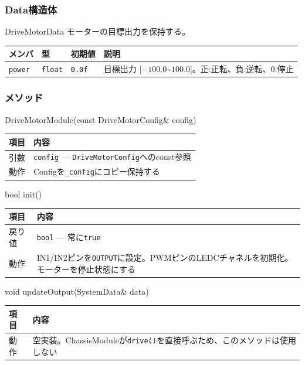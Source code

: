 \subsubsection{Data構造体}

\begin{funcblock}{DriveMotorData}
モーターの目標出力を保持する。

\begin{longtable}{l l l p{5.0cm}}
\toprule
\textbf{メンバ} & \textbf{型} & \textbf{初期値} & \textbf{説明} \\
\midrule
\endhead
\texttt{power} & \texttt{float} & \texttt{0.0f} & 目標出力 [$-100.0$\textasciitilde$100.0$]。正:正転、負:逆転、0:停止 \\
\bottomrule
\end{longtable}
\end{funcblock}

\subsubsection{メソッド}

\begin{funcblock}{DriveMotorModule(const DriveMotorConfig\& config)}
\begin{tabularx}{\textwidth}{l X}
\toprule
\textbf{項目} & \textbf{内容} \\
\midrule
引数   & \texttt{config} --- \texttt{DriveMotorConfig}へのconst参照 \\
動作   & Configを\texttt{\_config}にコピー保持する \\
\bottomrule
\end{tabularx}
\end{funcblock}

\begin{funcblock}{bool init()}
\begin{tabularx}{\textwidth}{l X}
\toprule
\textbf{項目} & \textbf{内容} \\
\midrule
戻り値   & \texttt{bool} --- 常に\texttt{true} \\
動作     & IN1/IN2ピンを\texttt{OUTPUT}に設定。PWMピンのLEDCチャネルを初期化。モーターを停止状態にする \\
\bottomrule
\end{tabularx}
\end{funcblock}

\begin{funcblock}{void updateOutput(SystemData\& data)}
\begin{tabularx}{\textwidth}{l X}
\toprule
\textbf{項目} & \textbf{内容} \\
\midrule
動作   & 空実装。ChassisModuleが\texttt{drive()}を直接呼ぶため、このメソッドは使用しない \\
\bottomrule
\end{tabularx}
\end{funcblock}

